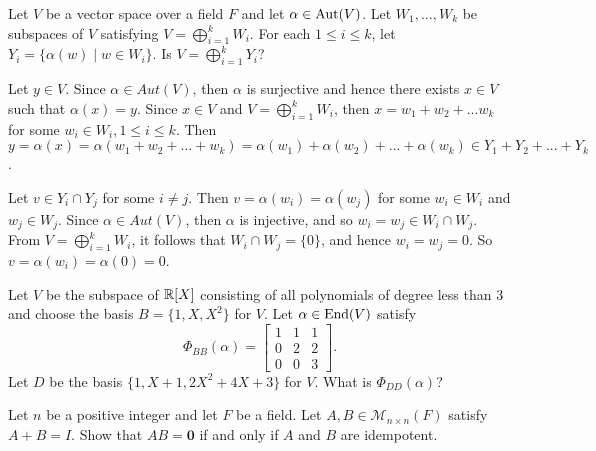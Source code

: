\begin{problem}[Golan 354]
Let $V$ be a vector space over a field $F$ and let $\alpha \in \operatorname{Aut}(V)$.  Let
$W_1, \dots, W_k$ be subspaces of $V$ satisfying $V = \bigoplus_{i=1}^k W_i$.
For each $1\leq i \leq k$, let $Y_i = \{\alpha(w) \mid w \in W_i\}$.
Is $V = \bigoplus_{i=1}^k Y_i$?
\end{problem}
\smallskip
\begin{solution}

Let $y \in V$. Since $\alpha \in Aut(V)$, then $\alpha$ is surjective and hence 
there exists $x \in V$ such that $\alpha(x)=y$. Since $x \in V$ and 
$V = \bigoplus_{i=1}^k W_i$, then $x=w_1+w_2+...w_k$ for some $w_i \in W_i, 1 \le i \le k$. 
Then $y=\alpha(x)=\alpha(w_1+w_2+...+w_k)=\alpha(w_1)+\alpha(w_2)+...+\alpha(w_k) \in Y_1 + Y_2 + ... + Y_k$.

\smallskip

Let $v \in Y_i \cap Y_j$ for some $i \ne j$. Then $v=\alpha(w_i)=\alpha(w_j)$ 
for some $w_i \in W_i$ and $w_j \in W_j$. Since $\alpha \in Aut(V)$, then $\alpha$ 
is injective, and so $w_i=w_j \in W_i \cap W_j$. From $V = \bigoplus_{i=1}^k W_i$, 
it follows that $W_i \cap W_j = \{0\}$, and hence $w_i=w_j=0$. So $v=\alpha(w_i)=\alpha(0)=0$.

\end{solution}

\begin{ex}[Golan 415]
Let $V$ be the subspace of $\mathbb{R}[X]$ consisting of all polynomials of degree less
than 3 and choose the basis $B = \{1, X, X^2\}$ for $V$. Let $\alpha \in \operatorname{End}(V)$ satisfy
\[
\Phi_{BB}(\alpha) = 
\begin{bmatrix} 
1 & 1 & 1\\ 
0 & 2 & 2\\
0 & 0 & 3
\end{bmatrix}.
\]
Let $D$ be the basis $\{1, X+1, 2X^2 + 4X + 3\}$ for $V$.  What is $\Phi_{DD}(\alpha)$?
\end{ex}

\probskip

\begin{ex}[Golan 467]
Let $n$ be a positive integer and let $F$ be a field.  Let 
$A, B\in \mathcal{M}_{n\times n}(F)$ satisfy $A + B = I$.  Show that $AB = \mathbf{0}$
if and only if $A$ and $B$ are idempotent.
\end{ex}

